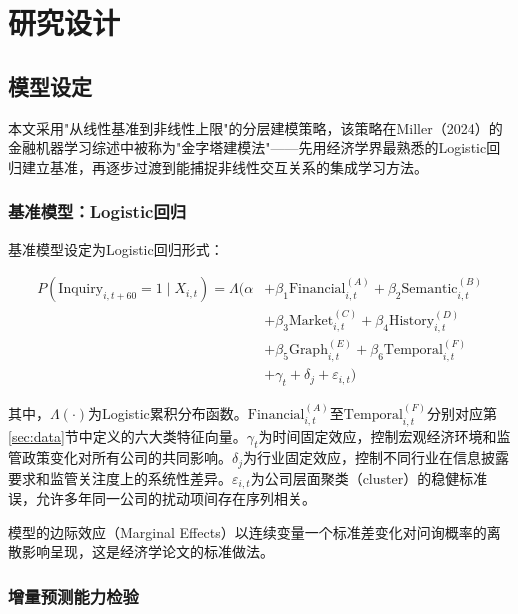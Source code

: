 
\section{研究设计}

\subsection{模型设定}

本文采用"从线性基准到非线性上限"的分层建模策略，该策略在Miller（2024）的金融机器学习综述中被称为"金字塔建模法"——先用经济学界最熟悉的Logistic回归建立基准，再逐步过渡到能捕捉非线性交互关系的集成学习方法。

\subsubsection{基准模型：Logistic回归}

基准模型设定为Logistic回归形式：

\begin{equation}
\begin{aligned}
P(\text{Inquiry}_{i,t+60}=1 \mid X_{i,t}) = \Lambda\bigg(
\alpha &+ \beta_1 \text{Financial}_{i,t}^{(A)} + \beta_2 \text{Semantic}_{i,t}^{(B)} \\
&+ \beta_3 \text{Market}_{i,t}^{(C)} + \beta_4 \text{History}_{i,t}^{(D)} \\
&+ \beta_5 \text{Graph}_{i,t}^{(E)} + \beta_6 \text{Temporal}_{i,t}^{(F)} \\
&+ \gamma_t + \delta_j + \varepsilon_{i,t} \bigg)
\label{eq:logit}
\end{aligned}
\end{equation}

其中，$\Lambda(\cdot)$为Logistic累积分布函数。$\text{Financial}_{i,t}^{(A)}$至$\text{Temporal}_{i,t}^{(F)}$分别对应第\ref{sec:data}节中定义的六大类特征向量。$\gamma_t$为时间固定效应，控制宏观经济环境和监管政策变化对所有公司的共同影响。$\delta_j$为行业固定效应，控制不同行业在信息披露要求和监管关注度上的系统性差异。$\varepsilon_{i,t}$为公司层面聚类（cluster）的稳健标准误，允许多年同一公司的扰动项间存在序列相关。

模型的边际效应（Marginal Effects）以连续变量一个标准差变化对问询概率的离散影响呈现，这是经济学论文的标准做法。

\subsubsection{增量预测能力检验}

